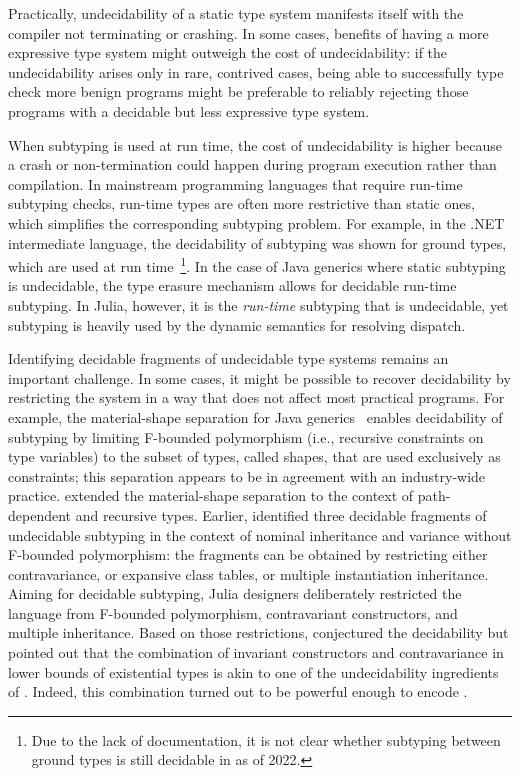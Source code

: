 Practically, undecidability of a static type system manifests itself with
the compiler not terminating or crashing. In some cases,
benefits of having a more expressive type system might outweigh the cost of
undecidability: if the undecidability arises only in rare, contrived cases,
being able to successfully type check more benign programs
might be preferable to reliably rejecting those
programs with a decidable but less expressive type system.

When subtyping is used at run time, the cost of undecidability is higher
because a crash or non-termination could happen during program execution
rather than compilation.
In mainstream programming languages that require run-time subtyping checks,
run-time types are often more restrictive than static ones,
which simplifies the corresponding subtyping problem.
For example, in the .NET intermediate language,
the decidability of subtyping was shown for ground types,
which are used at run time~\cite{kennedy:nom-sub-var-dec:2007}\footnote{Due
to the lack of documentation, it is not clear whether subtyping between ground
types is still decidable in \CSharp as of 2022.}.
In the case of Java generics where static subtyping is undecidable,
the type erasure mechanism allows for decidable run-time subtyping.
In Julia, however, it is the \emph{run-time} subtyping that is undecidable,
yet subtyping is heavily used by the dynamic semantics for resolving dispatch.

Identifying decidable fragments of undecidable type systems
remains an important challenge.
In some cases, it might be possible to recover
decidability by restricting the system in a way that does not affect most
practical programs. For example, the material-shape separation for Java
generics~\cite{greenman:f-bound-material-shape:2014}
enables decidability of subtyping by limiting F-bounded polymorphism %
(i.e., recursive constraints on type variables)
to the subset of types, called shapes, that are used exclusively as constraints;
this separation appears to be in agreement with an industry-wide practice.
\citet{mackay:path-dep-dec:2020} extended the material-shape separation
to the context of path-dependent and recursive types. %
Earlier, \citet{kennedy:nom-sub-var-dec:2007} identified three decidable
fragments of undecidable subtyping in the context of nominal inheritance
and variance without F-bounded polymorphism: the fragments can be obtained by
restricting either contravariance, or expansive class tables,
or multiple instantiation inheritance.
Aiming for decidable subtyping, Julia designers deliberately restricted
the language from F-bounded polymorphism, contravariant constructors,
and multiple inheritance.
Based on those restrictions, \citet{bezanson:julia:2015} conjectured
the decidability but pointed out that
the combination of invariant constructors
and contravariance in lower bounds of existential types
is akin to one of the undecidability ingredients of \FSub.
Indeed, this combination turned out to be powerful enough to encode \FSub.


